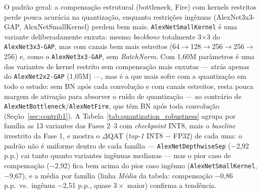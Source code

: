 \documentclass[conference]{IEEEtran}
\begin{document}
O padrão geral: a compensação estrutural (bottleneck, Fire) com kernels restritos perde pouca
acurácia na quantização, enquanto restrições ingênuas (AlexNet3x3-GAP, AlexNetSmallKernel) perdem
bem mais. \texttt{AlexNetSmallKernel} é uma variante deliberadamente enxuta: mesmo
\textit{backbone} totalmente 3$\times$3 do \texttt{AlexNet3x3-GAP}, mas com canais bem mais estreitos
(64$\rightarrow$128$\rightarrow$256$\rightarrow$256$\rightarrow$256) e, como o \texttt{AlexNet3x3-GAP},
sem \textit{BatchNorm}. Com 1,60M parâmetros é uma das variantes de kernel restrito sem compensação
mais enxutas — atrás apenas do \texttt{AlexNet2x2-GAP} (1,05M) —, mas é a que mais sofre com a
quantização em todo o estudo: sem BN após cada
convolução e com canais estreitos, resta pouca margem de ativação para absorver o ruído de
quantização — ao contrário de \texttt{AlexNetBottleneck}/\texttt{AlexNetFire}, que têm BN após toda
convolução (Seção~\ref{sec:contrib1}). A Tabela~\ref{tab:quantization_robustness} agrupa por
família as 13 variantes das Fases 2--3 com \textit{checkpoint} INT8, mais o \textit{baseline}
irrestrito da Fase 1, e mostra o
$\Delta$QAT (\textit{top-1} INT8 $-$ FP32) de cada uma: o padrão não é uniforme dentro de cada
família — \texttt{AlexNetDepthwiseSep} ($-$2,92 p.p.) cai tanto quanto variantes ingênuas
medianas — mas o pior caso de compensação ($-$2,92) fica bem acima do pior caso ingênuo
(\texttt{AlexNetSmallKernel}, $-$9,67), e a média por família (linha \textit{Média} da tabela:
compensação $-$0,86 p.p.\ vs.\ ingênua $-$2,51 p.p., quase $3\times$ maior) confirma a tendência.
\end{document}
